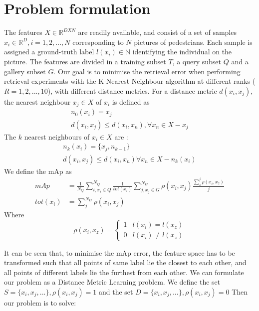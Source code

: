 \documentclass[10pt,technote]{IEEEtran}
\begin{document}
\section{Problem formulation}
The features $X \in \mathbb{R}^{D X N}$ are readily available, and consist of a set of samples $x_i \in \mathbb{R}^D, i = 1, 2, ..., N$ corresponding to $N$ pictures of pedestrians. Each sample is assigned a ground-truth label $l(x_i) \in \mathbb{N}$ identifying the individual on the picture. The features are divided in a training subset $T$, a query subset $Q$ and a gallery subset $G$. Our goal is to minimise the retrieval error when performing retrieval experiments with the K-Nearest Neighbour algorithm \cite{Cover1967} at different ranks ($R = 1, 2, ..., 10 $), with different distance metrics. For a distance metric $d(x_i, x_j)$, the nearest neighbour $x_j \in X$ of $x_i$ is defined as
\begin{equation}
    \begin{aligned}
    n_0(x_i) = x_j \\
d(x_i, x_j) \le d(x_i, x_n), \forall x_n \in X - x_j
    \end{aligned}
\end{equation}
The $k$ nearest neighbours of $x_i \in X$ are :
\begin{equation}
    \begin{aligned}
    n_k(x_i) = \lbrace x_j, n_{k-1}\rbrace 
    \\
    d(x_i, x_j) \le d(x_i, x_n) \forall x_n \in X - n_k(x_i)
    \end{aligned}
\end{equation}
We define the mAp as
\begin{equation}
\begin{aligned}
    mAp & =   \frac{1}{N_Q}\sum^{N_Q}_{i, x_i \in Q}  \frac{1}{tot(x_i)}\sum^{N_G}_{j, x_j \in G}\rho(x_i, x_j)\frac{\sum^{j}_z\rho(x_i, x_z)}{j} \\ 
    tot(x_i)& = \sum^{N_G}_j\rho(x_i, x_j)
    \end{aligned}
\end{equation}
Where 
\begin{equation}
    \rho(x_i, x_z) =
    \begin{cases}
        1 & l(x_i) = l(x_z)\\
        0 & l(x_i) \neq l(x_z)
    \end{cases}
\end{equation}

It can be seen that, to minimise the mAp error, the feature space has to be transformed such that all points of same label lie the closest to each other, and all points of different labels lie the furthest from each other.
We can formulate our problem as a Distance Metric Learning problem. We define the set $S = \lbrace x_i, x_j, ...\rbrace, \rho(x_i, x_j) = 1$ and the set $D = \lbrace x_i, x_j, ...\rbrace,  \rho(x_i, x_j) = 0$
Then our problem is to solve:
\end{document}
